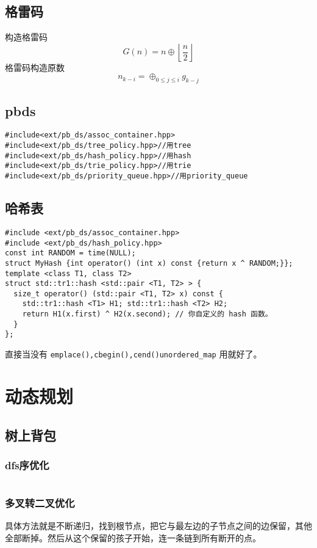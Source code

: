 \documentclass[titlepage, a4paper]{report}
\newcommand{\cppcode}[1]{  
    \inputminted[mathescape]{cpp}{source/#1}  
}
\begin{document}
\section{格雷码}
构造格雷码\\
$$
G(n)=n\oplus \left\lfloor\frac{n}{2}\right\rfloor
$$
格雷码构造原数\\
$$
n_{k-i}=\oplus_{0\le j \le i} g_{k-j}
$$

\section{pbds}
\begin{verbatim}  
#include<ext/pb_ds/assoc_container.hpp>
#include<ext/pb_ds/tree_policy.hpp>//用tree
#include<ext/pb_ds/hash_policy.hpp>//用hash
#include<ext/pb_ds/trie_policy.hpp>//用trie
#include<ext/pb_ds/priority_queue.hpp>//用priority_queue    
\end{verbatim}  

\section{哈希表}
\begin{verbatim}
#include <ext/pb_ds/assoc_container.hpp>
#include <ext/pb_ds/hash_policy.hpp>
const int RANDOM = time(NULL);
struct MyHash {int operator() (int x) const {return x ^ RANDOM;}};
template <class T1, class T2>
struct std::tr1::hash <std::pair <T1, T2> > {
  size_t operator() (std::pair <T1, T2> x) const {
    std::tr1::hash <T1> H1; std::tr1::hash <T2> H2;
    return H1(x.first) ^ H2(x.second); // 你自定义的 hash 函数。
  }
};
\end{verbatim}
直接当没有 \texttt{emplace(),cbegin(),cend()}\texttt{unordered\_map} 用就好了。\\


\chapter{动态规划}
\section{树上背包}
\subsection{dfs序优化}
\cppcode{树上背包dfs.cpp}

\subsection{多叉转二叉优化}
具体方法就是不断递归，找到根节点，把它与最左边的子节点之间的边保留，其他全部断掉。然后从这个保留的孩子开始，连一条链到所有断开的点。\\
\cppcode{树上背包转二叉.cpp}
\end{document}
